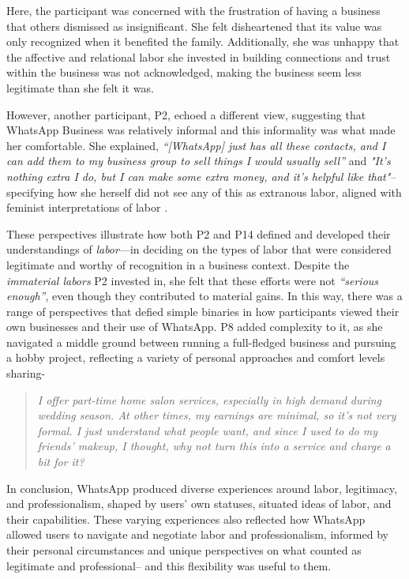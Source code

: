Here, the participant was concerned with the frustration of having a business that others dismissed as insignificant. She felt disheartened that its value was only recognized when it benefited the family. Additionally, she was unhappy that the affective and relational labor she invested in building connections and trust within the business was not acknowledged, making the business seem less legitimate than she felt it was.
 

However, another participant, P2, echoed a different view, suggesting that WhatsApp Business was relatively informal and this informality was what made her comfortable. She explained, \textit{“[WhatsApp] just has all these contacts, and I can add them to my business group to sell things I would usually sell”} and \textit{"It's nothing extra I do, but I can make some extra money, and it's helpful like that"}-- specifying how she herself did not see any of this as extranous labor, aligned with feminist interpretations of labor \cite{lokot2020unequal}.

These perspectives illustrate how both P2 and P14 defined and developed their understandings of \textit{labor}—in deciding on the types of labor that were considered legitimate and worthy of recognition in a business context. Despite the \textit{immaterial labors} P2 invested in, she felt that these efforts were not \textit{“serious enough”}, even though they contributed to material gains. In this way, there was a range of perspectives that defied simple binaries in how participants viewed their own businesses and their use of WhatsApp. P8 added complexity to it, as she navigated a middle ground between running a full-fledged business and pursuing a hobby project, reflecting a variety of personal approaches and comfort levels sharing- 

\begin{quote}
    \textit{I offer part-time home salon services, especially in high demand during wedding season. At other times, my earnings are minimal, so it’s not very formal. I just understand what people want, and since I used to do my friends' makeup, I thought, why not turn this into a service and charge a bit for it?}
\end{quote}


In conclusion, WhatsApp produced diverse experiences around labor, legitimacy, and professionalism, shaped by users' own statuses, situated ideas of labor, and their capabilities. These varying experiences also reflected how WhatsApp allowed users to navigate and negotiate labor and professionalism, informed by their personal circumstances and unique perspectives on what counted as legitimate and professional-- and this flexibility was useful to them. 

